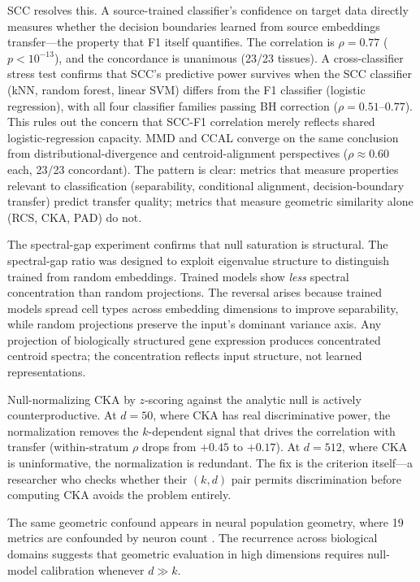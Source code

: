 \documentclass[11pt]{article}
\begin{document}
SCC resolves this. A source-trained classifier's confidence on target
data directly measures whether the decision boundaries learned from
source embeddings transfer---the property that F1 itself
quantifies. The correlation is $\rho = 0.77$ ($p < 10^{-13}$), and
the concordance is unanimous (23/23 tissues). A cross-classifier
stress test confirms that SCC's predictive power
survives when the SCC classifier (kNN, random forest, linear SVM)
differs from the F1 classifier (logistic regression), with all four
classifier families passing BH correction ($\rho = 0.51$--$0.77$).
This rules out the concern that SCC-F1 correlation merely reflects
shared logistic-regression capacity. MMD and CCAL converge on the same
conclusion from distributional-divergence and centroid-alignment
perspectives ($\rho \approx 0.60$ each, 23/23 concordant). The pattern
is clear: metrics that measure properties relevant to classification
(separability, conditional alignment, decision-boundary transfer)
predict transfer quality; metrics that measure geometric similarity
alone (RCS, CKA, PAD) do not.

The spectral-gap experiment confirms that null saturation is structural.
The spectral-gap ratio was designed to exploit eigenvalue structure to
distinguish trained from random embeddings. Trained models show
\emph{less} spectral concentration than random projections. The
reversal arises because
trained models spread cell types across embedding dimensions to improve
separability, while random projections preserve the input's dominant
variance axis. Any projection of biologically structured gene expression
produces concentrated centroid spectra; the concentration reflects input
structure, not learned representations.

Null-normalizing CKA by $z$-scoring against the analytic null is
actively counterproductive. At $d = 50$, where CKA has real
discriminative power, the normalization removes the $k$-dependent signal
that drives the correlation with transfer (within-stratum $\rho$ drops
from $+0.45$ to $+0.17$). At $d = 512$, where CKA is uninformative,
the normalization is redundant. The fix is the criterion itself---a
researcher who checks whether their $(k, d)$ pair permits discrimination
before computing CKA avoids the problem entirely.

The same geometric confound appears in neural population geometry, where
19 metrics are confounded by neuron count \citep{tower2026bracket}. The
recurrence across biological domains suggests that geometric evaluation
in high dimensions requires null-model calibration whenever $d \gg k$.
\end{document}

